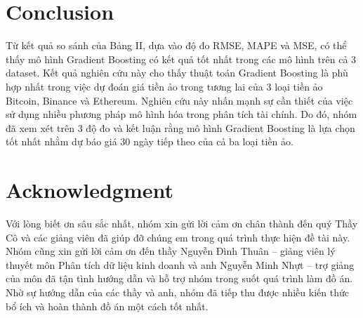 \documentclass[conference]{IEEEtran}
\begin{document}
\section{Conclusion}
Từ kết quả so sánh của Bảng II, dựa vào độ đo RMSE, MAPE và MSE, có thể thấy mô hình Gradient Boosting có kết quả tốt nhất trong các mô hình trên cả 3 dataset. Kết quả nghiên cứu này cho thấy thuật toán Gradient Boosting là phù hợp nhất trong việc dự đoán giá tiền ảo trong tương lai của 3 loại tiền ảo Bitcoin, Binance và Ethereum. Nghiên cứu này nhấn mạnh sự cần thiết của việc sử dụng nhiều phương pháp mô hình hóa trong phân tích tài chính. Do đó, nhóm đã xem xét trên 3 độ đo và kết luận rằng mô hình Gradient Boosting là lựa chọn tốt nhất nhằm dự báo giá 30 ngày tiếp theo của cả ba loại tiền ảo.
\section*{Acknowledgment}
Với lòng biết ơn sâu sắc nhất, nhóm xin gửi lời cảm ơn chân thành đến quý Thầy Cô và các giảng viên đã giúp đỡ chúng em trong quá trình thực hiện đề tài này. Nhóm cũng xin gửi lời cảm ơn đến thầy Nguyễn Đình Thuân – giảng viên lý thuyết môn Phân tích dữ liệu kinh doanh và anh Nguyễn Minh Nhựt – trợ giảng của môn đã tận tình hướng dẫn và hỗ trợ nhóm trong suốt quá trình làm đồ án. Nhờ sự hướng dẫn của các thầy và anh, nhóm đã tiếp thu được nhiều kiến thức bổ ích và hoàn thành đồ án một cách tốt nhất.
\end{document}

